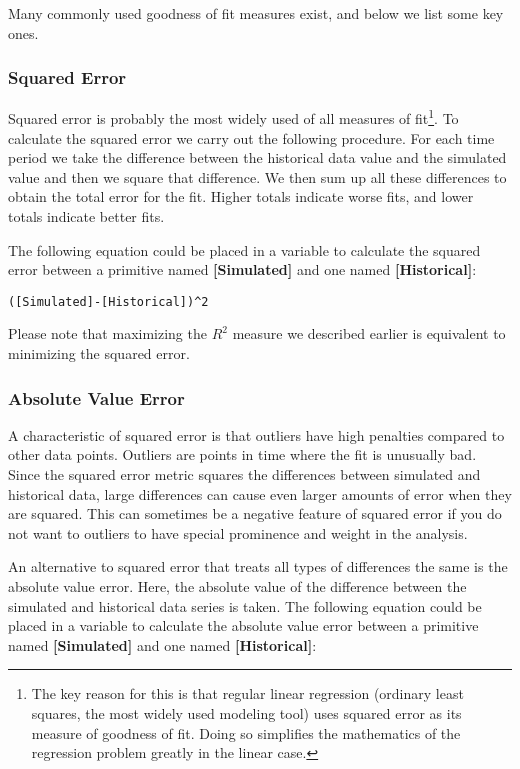 \documentclass[]{memoir}
\newcommand{\p}[1]{\textbf{{[}#1{]}}}
\begin{document}
Many commonly used goodness of fit measures exist, and below we list
some key ones.

\subsubsection{Squared Error}

Squared error is probably the most widely used of all measures of
fit\footnote{The key reason for this is that regular linear regression
  (ordinary least squares, the most widely used modeling tool) uses
  squared error as its measure of goodness of fit. Doing so simplifies
  the mathematics of the regression problem greatly in the linear case.}.
To calculate the squared error we carry out the following procedure. For
each time period we take the difference between the historical data
value and the simulated value and then we square that difference. We
then sum up all these differences to obtain the total error for the fit.
Higher totals indicate worse fits, and lower totals indicate better
fits.

The following equation could be placed in a variable to calculate the
squared error between a primitive named \p{Simulated} and one named
\p{Historical}:

\lstinline!([Simulated]-[Historical])^2!

Please note that maximizing the $R^2$ measure we described earlier is
equivalent to minimizing the squared error.

\subsubsection{Absolute Value Error}

A characteristic of squared error is that outliers have high penalties
compared to other data points. Outliers are points in time where the fit
is unusually bad. Since the squared error metric squares the differences
between simulated and historical data, large differences can cause even
larger amounts of error when they are squared. This can sometimes be a
negative feature of squared error if you do not want to outliers to have
special prominence and weight in the analysis.

An alternative to squared error that treats all types of differences the
same is the absolute value error. Here, the absolute value of the
difference between the simulated and historical data series is taken.
The following equation could be placed in a variable to calculate the
absolute value error between a primitive named \p{Simulated} and one
named \p{Historical}:
\end{document}
